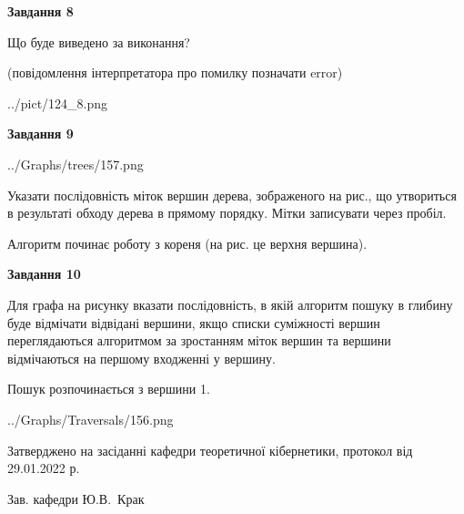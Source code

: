 \documentclass[12pt, ukrainian]{article}
\begin{document}
{\begin {large}
{\begin {center}\textbf{Завдання 8}\end {center}}\par
Що буде виведено за виконання?\par
 (повідомлення інтерпретатора про помилку позначати error)\par
\begin{center}
	{../pict/124_8.png}
\end{center}
\newpage

{\begin {center}\textbf{Завдання 9}\end {center}}\par

\begin{center}
	{../Graphs/trees/157.png}
\end{center}
Указати послідовність міток вершин дерева, зображеного на рис., що утвориться в результаті обходу дерева в прямому порядку. Мітки записувати через пробіл.\par Алгоритм починає роботу з кореня (на рис. це верхня вершина).\par
\newpage

{\begin {center}\textbf{Завдання 10}\end {center}}\par
Для графа на рисунку вказати послідовність, в якій алгоритм пошуку в глибину буде відмічати відвідані вершини, якщо списки суміжності вершин переглядаються алгоритмом за зростанням міток вершин та вершини відмічаються на першому вход\-женні у вершину.\par
Пошук розпочинається з вершини 1.\par

\begin{center}
	{../Graphs/Traversals/156.png}
\end{center}\par
\newpage


\end {large}
}
{\smallskip \begin {small} Затверджено на засіданні кафедри теоретичної кібернетики, протокол  від   29.01.2022 р.\par\smallskip\smallskip
{\parbox {6.5 cm}{Зав. кафедри \dotfill Ю.В.~Крак}} \end{small}}
\end{document}
